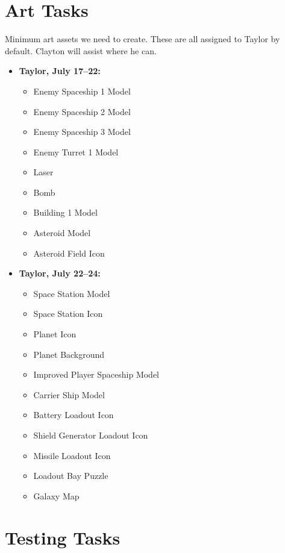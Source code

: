 \documentclass[journal]{IEEEtran}
\begin{document}
\section{Art Tasks}

Minimum art assets we need to create. These are all assigned to Taylor by default. Clayton will assist where he can.

\begin{itemize}
    \item \textbf{Taylor, July 17--22:}
    \begin{itemize}
    \item Enemy Spaceship 1 Model
    \item Enemy Spaceship 2 Model
    \item Enemy Spaceship 3 Model
    \item Enemy Turret 1 Model
    \item Laser
    \item Bomb
    \item Building 1 Model
    \item Asteroid Model
    \item Asteroid Field Icon
    \end{itemize}
    \item \textbf{Taylor, July 22--24:}
    \begin{itemize}
    \item Space Station Model
    \item Space Station Icon
    \item Planet Icon
    \item Planet Background
    \item Improved Player Spaceship Model
    \item Carrier Ship Model
    \item Battery Loadout Icon
    \item Shield Generator Loadout Icon
    \item Missile Loadout Icon
    \item Loadout Bay Puzzle
    \item Galaxy Map
    \end{itemize}

\end{itemize}

\section{Testing Tasks}
\end{document}
